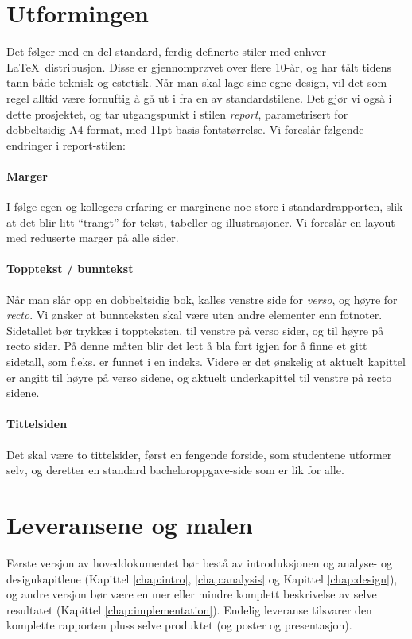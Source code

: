 \section{Utformingen}

Det følger med en del standard, ferdig definerte stiler med enhver \LaTeX~distribusjon. Disse er gjennomprøvet over flere 10-år, og har tålt tidens tann både teknisk og estetisk. Når man skal lage sine egne design, vil det som regel alltid være fornuftig å gå ut i fra en  av standardstilene. Det gjør vi også i dette prosjektet, og tar utgangspunkt i stilen {\em report}, parametrisert for dobbeltsidig A4-format, med 11pt basis fontstørrelse. Vi foreslår følgende endringer i report-stilen: 

\paragraph{Marger}
I følge egen og kollegers erfaring er marginene noe store i standardrapporten, slik at det blir litt ``trangt'' for tekst, tabeller og illustrasjoner. Vi foreslår en layout med reduserte marger på alle sider.


\paragraph{Topptekst / bunntekst}
Når man slår opp en dobbeltsidig bok, kalles venstre side for {\em verso}, og høyre for {\em recto}.
Vi ønsker at bunnteksten skal være uten andre elementer enn fotnoter. Sidetallet bør trykkes i toppteksten, til venstre på verso sider, og til høyre på recto sider. På denne måten
blir det lett å bla fort igjen for å finne et gitt sidetall,  som f.eks. er funnet i en indeks. Videre er det ønskelig at aktuelt kapittel er angitt til høyre på verso sidene, og aktuelt underkapittel til venstre på recto sidene.

\paragraph{Tittelsiden} 
Det skal være to tittelsider, først en fengende forside, som studentene utformer selv, og deretter en standard bacheloroppgave-side som er lik for alle.


\section{Leveransene og malen}
Første versjon av hoveddokumentet  bør bestå av introduksjonen og analyse- og designkapitlene (Kapittel \ref{chap:intro}, \ref{chap:analysis} og Kapittel \ref{chap:design}), og andre versjon bør være en mer eller mindre komplett beskrivelse av selve resultatet (Kapittel \ref{chap:implementation}). Endelig leveranse tilsvarer den komplette rapporten pluss selve produktet (og poster og presentasjon).





